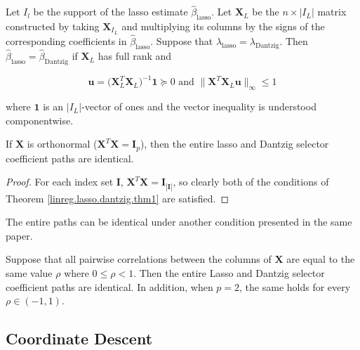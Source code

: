 \begin{theorem}\label{linreg.lasso.dantzig.thm1} Let \(I_l\) be the support of the lasso estimate \(\hat{\beta}_{\text{lasso}}\). Let \(\boldsymbol{X}_L\) be the \(n \times | I_L|\) matrix constructed by taking \(\boldsymbol{X}_{I_L}\) and multiplying its columns by the signs of the corresponding coefficients in \(\hat{\beta}_{\text{lasso}}\). Suppose that \(\lambda_{\text{lasso}} = \lambda_{\text{Dantzig}}\). Then \(\hat{\beta}_{\text{lasso}} = \hat{\beta}_{\text{Dantzig}}\) if \(\boldsymbol{X}_L\) has full rank and 

\[
\boldsymbol{u} = \big( \boldsymbol{X}_L^T \boldsymbol{X}_L \big)^{-1} \boldsymbol{1} \succeq 0 \text{ and } \lVert \boldsymbol{X}^T \boldsymbol{X}_L \boldsymbol{u} \rVert_\infty \leq 1
\]

where \(\boldsymbol{1} \) is an \(| I_L|\)-vector of ones and the vector inequality is understood componentwise.

\end{theorem}

\begin{corollary} If \(\boldsymbol{X}\) is orthonormal (\(\boldsymbol{X}^T \boldsymbol{X} = \boldsymbol{I}_p\)), then the entire lasso and Dantzig selector coefficient paths are identical.

\end{corollary}

\begin{proof} For each index set \(\boldsymbol{I}\), \(\boldsymbol{X}^T \boldsymbol{X} = \boldsymbol{I}_{| \boldsymbol{I} |}\), so clearly both of the conditions of Theorem \ref{linreg.lasso.dantzig.thm1} are satisfied.

\end{proof}


The entire paths can be identical under another condition presented in the same paper.

\begin{theorem}
Suppose that all pairwise correlations between the columns of \(\boldsymbol{X}\) are equal to the same value \(\rho\) where \(0 \leq \rho < 1\). Then the entire Lasso and Dantzig selector coefficient paths are identical. In addition, when \(p=2\), the same holds for every \(\rho \in (-1, 1)\).

\end{theorem}

\subsection{Coordinate Descent}

